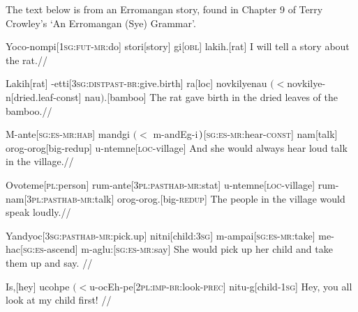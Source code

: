 

The text below is from an Erromangan story, found in Chapter 9 of Terry
Crowley's `An Erromangan (Sye) Grammar'.

\bigskip
\exdisplay
\begingl
Yoco-nompi[\textsc{1sg:fut-mr:}do]
stori[story]
gi[\textsc{obl}]
lakih.[rat]
\endilg
\glft I will tell a story about the rat.//
\endgl
 \xe

\exdisplay
\begingl
Lakih[rat]
-etti[\textsc{3sg:distpast-br:}give.birth]
ra[\sc loc]
{novkilyenau $(<$novkilye-n}[dried.leaf-\sc const]
nau$)$.[bamboo]
\endilg
\glft The rat gave birth in the dried leaves of the bamboo.//
\endgl
\xe

\exdisplay\begingl
M-ante[\textsc{sg:es-mr:hab}]
{mandgi $(<$ m-andEg-i$\mskip2mu)$}[\textsc{sg:es-mr:}hear-\textsc{const}]
nam[talk]
orog-orog[big-\sc redup]
u-ntemne[\textsc{loc}-village]
\endilg
\glft And she would always hear loud talk in the village.//
\endgl
\xe

\exdisplay
\begingl
Ovoteme[\textsc{pl}:person]
rum-ante[\textsc{3pl:pasthab-mr:}stat]
u-ntemne[\textsc{loc}-village]
rum-nam[\textsc{3pl:pasthab-mr:}talk]
orog-orog.[big-\textsc{redup}]
\endilg
\glft The people in the village would speak loudly.//
\endgl
\xe

\exdisplay
\begingl
Yandyoc[\textsc{3sg:pasthab-mr:}pick.up]
nitni[child:\textsc{3sg}]
m-ampai[\textsc{sg:es-mr:}take]
me-hac[\textsc{sg:es-}ascend]
m-aglu:[\textsc{sg:es-mr:}say]
\endilg
\glft She would pick up her child and take them up and say. //
\endgl
\xe

\exdisplay
\begingl
Is,[hey]
{ucohpe $(<$u-ocEh-pe}[\textsc{2pl:imp-br:}look\textsc{-prec}]
nitu-g[child\textsc{-1sg}]
\endilg
\glft Hey, you all look at my child first! //
\endgl
\xe



